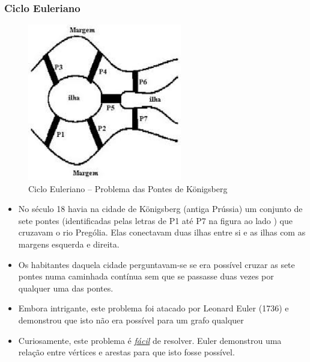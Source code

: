 \begin{frame}[fragile, allowframebreaks=0.9]
  \frametitle{Ciclo Euleriano}

\begin{figure}[!htb]
\centering
\includegraphics[width=0.60\textwidth, height=0.650\textheight]{figures/ilhas_euler.jpeg}
\caption{Ciclo Euleriano -- Problema das Pontes de Königsberg}
\end{figure}


\framebreak

\begin{itemize}
  \item No século 18 havia na cidade de Königsberg (antiga Prússia)  um conjunto de sete pontes
 (identificadas pelas letras de P1 até P7 na figura ao lado ) que cruzavam o rio  Prególia. 
 Elas conectavam duas ilhas  entre si e as ilhas com as margens esquerda
 e direita.
 
\item Os habitantes daquela cidade perguntavam-se se era possível cruzar 
as sete pontes numa caminhada contínua sem que se passasse duas vezes por 
qualquer uma das pontes.

\item  Embora intrigante, este problema foi atacado por Leonard Euler (1736) e demonstrou
que isto não era possível para um grafo qualquer

\item Curiosamente, este problema é \underline{\textit{fácil}} de resolver. Euler demonstrou
uma relação entre vértices e arestas para que isto fosse possível.
\end{itemize}

\end{frame}




